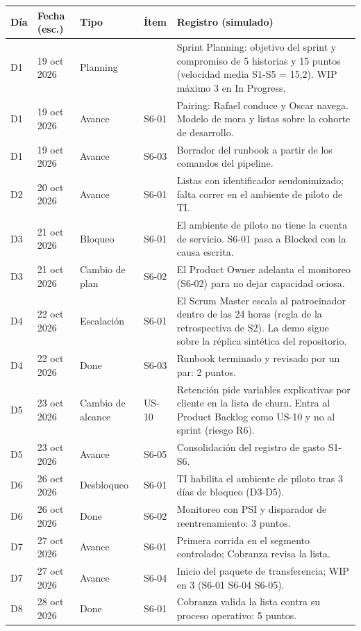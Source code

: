 \scriptsize
\begin{tabularx}{\linewidth}{l l l l X}
\toprule
\textbf{Día} & \textbf{Fecha (esc.)} & \textbf{Tipo} & \textbf{Ítem} & \textbf{Registro (simulado)} \\
\midrule
D1 & 19 oct 2026 & Planning &  & Sprint Planning: objetivo del sprint y compromiso de 5 historias y 15 puntos (velocidad media S1-S5 = 15,2). WIP máximo 3 en In Progress. \\
D1 & 19 oct 2026 & Avance & S6-01 & Pairing: Rafael conduce y Oscar navega. Modelo de mora y listas sobre la cohorte de desarrollo. \\
D1 & 19 oct 2026 & Avance & S6-03 & Borrador del runbook a partir de los comandos del pipeline. \\
D2 & 20 oct 2026 & Avance & S6-01 & Listas con identificador seudonimizado; falta correr en el ambiente de piloto de TI. \\
D3 & 21 oct 2026 & Bloqueo & S6-01 & El ambiente de piloto no tiene la cuenta de servicio. S6-01 pasa a Blocked con la causa escrita. \\
D3 & 21 oct 2026 & Cambio de plan & S6-02 & El Product Owner adelanta el monitoreo (S6-02) para no dejar capacidad ociosa. \\
D4 & 22 oct 2026 & Escalación & S6-01 & El Scrum Master escala al patrocinador dentro de las 24 horas (regla de la retrospectiva de S2). La demo sigue sobre la réplica sintética del repositorio. \\
D4 & 22 oct 2026 & Done & S6-03 & Runbook terminado y revisado por un par: 2 puntos. \\
D5 & 23 oct 2026 & Cambio de alcance & US-10 & Retención pide variables explicativas por cliente en la lista de churn. Entra al Product Backlog como US-10 y no al sprint (riesgo R6). \\
D5 & 23 oct 2026 & Avance & S6-05 & Consolidación del registro de gasto S1-S6. \\
D6 & 26 oct 2026 & Desbloqueo & S6-01 & TI habilita el ambiente de piloto tras 3 días de bloqueo (D3-D5). \\
D6 & 26 oct 2026 & Done & S6-02 & Monitoreo con PSI y disparador de reentrenamiento: 3 puntos. \\
D7 & 27 oct 2026 & Avance & S6-01 & Primera corrida en el segmento controlado; Cobranza revisa la lista. \\
D7 & 27 oct 2026 & Avance & S6-04 & Inicio del paquete de transferencia; WIP en 3 (S6-01 S6-04 S6-05). \\
D8 & 28 oct 2026 & Done & S6-01 & Cobranza valida la lista contra su proceso operativo: 5 puntos. \\

\end{tabularx}
